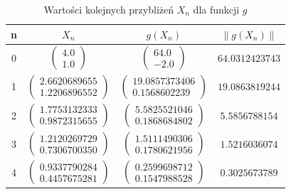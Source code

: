 \documentclass{article}
\begin{document}
    \begin{table}[htb]
      \centering
      \caption{Wartości kolejnych przybliżeń $X_n$ dla funkcji $g$}
      \label{tab:g}
      \begin{tabular}{|c|c|c|c|}
        \hline
        n & $X_n$                                                                       & $g(X_n)$                                                                                   & $\lVert g(X_n)\rVert$           \\ \hline
        0 & $\begin{pmatrix} 4.0          \\ 1.0                         \end{pmatrix}$ & $\begin{pmatrix} 64.0                        \\ -2.0                        \end{pmatrix}$ & $ 64.0312423743 $               \\ \hline
        1 & $\begin{pmatrix} 2.6620689655 \\ 1.2206896552                \end{pmatrix}$ & $\begin{pmatrix} 19.0857373406               \\ 0.1568602239                \end{pmatrix}$ & $ 19.0863819244 $               \\ \hline
        2 & $\begin{pmatrix} 1.7753132333 \\ 0.9872315655                \end{pmatrix}$ & $\begin{pmatrix} 5.5825521046                \\ 0.1868684802                \end{pmatrix}$ & $ 5.5856788154 $                \\ \hline
        3 & $\begin{pmatrix} 1.2120269729 \\ 0.7306700350                \end{pmatrix}$ & $\begin{pmatrix} 1.5111490306                \\ 0.1780621956                \end{pmatrix}$ & $ 1.5216036074 $                \\ \hline
        4 & $\begin{pmatrix} 0.9337790284 \\ 0.4457675281                \end{pmatrix}$ & $\begin{pmatrix} 0.2599698712                \\ 0.1547988528                \end{pmatrix}$ & $ 0.3025673789 $                \\ \hline

\end{tabular}
\end{table}
\end{document}
